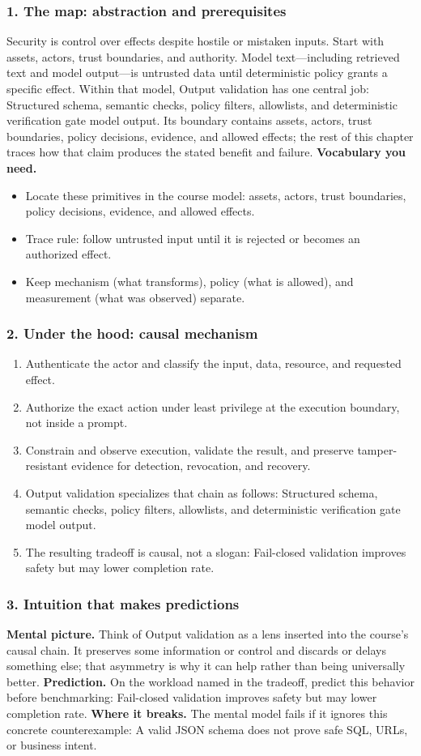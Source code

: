 \subsubsection*{1. The map: abstraction and prerequisites}
Security is control over effects despite hostile or mistaken inputs. Start with assets, actors, trust boundaries, and authority. Model text—including retrieved text and model output—is untrusted data until deterministic policy grants a specific effect.
Within that model, Output validation has one central job: Structured schema, semantic checks, policy filters, allowlists, and deterministic verification gate model output. Its boundary contains assets, actors, trust boundaries, policy decisions, evidence, and allowed effects; the rest of this chapter traces how that claim produces the stated benefit and failure.
\textbf{Vocabulary you need.}\begin{itemize}
\item Locate these primitives in the course model: assets, actors, trust boundaries, policy decisions, evidence, and allowed effects.
\item Trace rule: follow untrusted input until it is rejected or becomes an authorized effect.
\item Keep mechanism (what transforms), policy (what is allowed), and measurement (what was observed) separate.
\end{itemize}
\subsubsection*{2. Under the hood: causal mechanism}\begin{enumerate}
\item Authenticate the actor and classify the input, data, resource, and requested effect.
\item Authorize the exact action under least privilege at the execution boundary, not inside a prompt.
\item Constrain and observe execution, validate the result, and preserve tamper-resistant evidence for detection, revocation, and recovery.
\item Output validation specializes that chain as follows: Structured schema, semantic checks, policy filters, allowlists, and deterministic verification gate model output.
\item The resulting tradeoff is causal, not a slogan: Fail-closed validation improves safety but may lower completion rate.
\end{enumerate}
\subsubsection*{3. Intuition that makes predictions}
\textbf{Mental picture.} Think of Output validation as a lens inserted into the course's causal chain. It preserves some information or control and discards or delays something else; that asymmetry is why it can help rather than being universally better.
\textbf{Prediction.} On the workload named in the tradeoff, predict this behavior before benchmarking: Fail-closed validation improves safety but may lower completion rate.
\textbf{Where it breaks.} The mental model fails if it ignores this concrete counterexample: A valid JSON schema does not prove safe SQL, URLs, or business intent.
